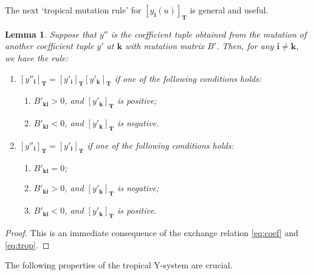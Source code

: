 \documentclass[pdftex]{sigma}
\numberwithin{equation}{section}
\newtheorem{Lemma}[Theorem]{Lemma}
\theoremstyle{definition}
\begin{document}
The next `tropical mutation rule' for $[y_{\mathbf{i}}(u)]_{\mathbf{T}}$
is general and  useful.
\begin{Lemma}
\label{lem:mutation}
Suppose that $y''$ is the coefficient tuple obtained from
the mutation of another coefficient tuple $y'$ at $\mathbf{k}$
with mutation matrix $B'$. Then, for any $\mathbf{i}\neq \mathbf{k}$,
we have the rule:
\begin{enumerate}\itemsep=0pt
\item[$(i)$] $[y''_{\mathbf{i}}]_{\mathbf{T}} =
 [y'_{\mathbf{i}}]_{\mathbf{T}}[y'_{\mathbf{k}}]_{\mathbf{T}}$
 if one of the following conditions holds:
\begin{enumerate}\itemsep=0pt
\item[$(a)$] $B'_{\mathbf{k}\mathbf{i}}> 0$,
 and $[y'_{\mathbf{k}}]_{\mathbf{T}}$ is
positive;
\item[$(b)$]  $B'_{\mathbf{k}\mathbf{i}}< 0$,
 and $[y'_{\mathbf{k}}]_{\mathbf{T}}$ is
negative.
\end{enumerate}
\item[$(ii)$]
$[y''_{\mathbf{i}}]_{\mathbf{T}} =
 [y'_{\mathbf{i}}]_{\mathbf{T}}$
 if one of the following conditions holds:
\begin{enumerate}\itemsep=0pt
\item[$(a)$] $B'_{\mathbf{k}\mathbf{i}}=0$;

\item[$(b)$]
 $B'_{\mathbf{k}\mathbf{i}}> 0$,
 and $[y'_{\mathbf{k}}]_{\mathbf{T}}$ is
 negative;
\item[$(c)$] $B'_{\mathbf{k}\mathbf{i}}< 0$,
 and $[y'_{\mathbf{k}}]_{\mathbf{T}}$ is
 positive.
 \end{enumerate}
 \end{enumerate}
\end{Lemma}
\begin{proof}
This is an immediate consequence of the exchange relation
\eqref{eq:coef} and \eqref{eq:trop}.
\end{proof}


The following properties
of the tropical Y-system are crucial.
\end{document}
